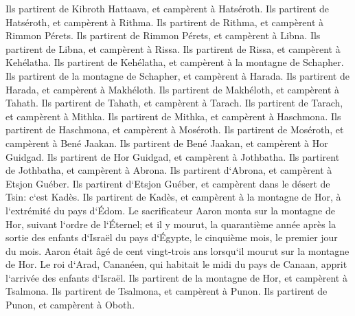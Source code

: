 \verse Ils partirent de Kibroth Hattaava, et campèrent à Hatséroth. 
\verse Ils partirent de Hatséroth, et campèrent à Rithma. 
\verse Ils partirent de Rithma, et campèrent à Rimmon Pérets. 
\verse Ils partirent de Rimmon Pérets, et campèrent à Libna. 
\verse Ils partirent de Libna, et campèrent à Rissa. 
\verse Ils partirent de Rissa, et campèrent à Kehélatha. 
\verse Ils partirent de Kehélatha, et campèrent à la montagne de Schapher. 
\verse Ils partirent de la montagne de Schapher, et campèrent à Harada. 
\verse Ils partirent de Harada, et campèrent à Makhéloth. 
\verse Ils partirent de Makhéloth, et campèrent à Tahath. 
\verse Ils partirent de Tahath, et campèrent à Tarach. 
\verse Ils partirent de Tarach, et campèrent à Mithka. 
\verse Ils partirent de Mithka, et campèrent à Haschmona. 
\verse Ils partirent de Haschmona, et campèrent à Moséroth. 
\verse Ils partirent de Moséroth, et campèrent à Bené Jaakan. 
\verse Ils partirent de Bené Jaakan, et campèrent à Hor Guidgad. 
\verse Ils partirent de Hor Guidgad, et campèrent à Jothbatha. 
\verse Ils partirent de Jothbatha, et campèrent à Abrona. 
\verse Ils partirent d`Abrona, et campèrent à Etsjon Guéber. 
\verse Ils partirent d`Etsjon Guéber, et campèrent dans le désert de Tsin: c`est Kadès. 
\verse Ils partirent de Kadès, et campèrent à la montagne de Hor, à l`extrémité du pays d`Édom. 
\verse Le sacrificateur Aaron monta sur la montagne de Hor, suivant l`ordre de l`Éternel; et il y mourut, la quarantième année après la sortie des enfants d`Israël du pays d`Égypte, le cinquième mois, le premier jour du mois. 
\verse Aaron était âgé de cent vingt-trois ans lorsqu`il mourut sur la montagne de Hor. 
\verse Le roi d`Arad, Cananéen, qui habitait le midi du pays de Canaan, apprit l`arrivée des enfants d`Israël. 
\verse Ils partirent de la montagne de Hor, et campèrent à Tsalmona. 
\verse Ils partirent de Tsalmona, et campèrent à Punon. 
\verse Ils partirent de Punon, et campèrent à Oboth. 
